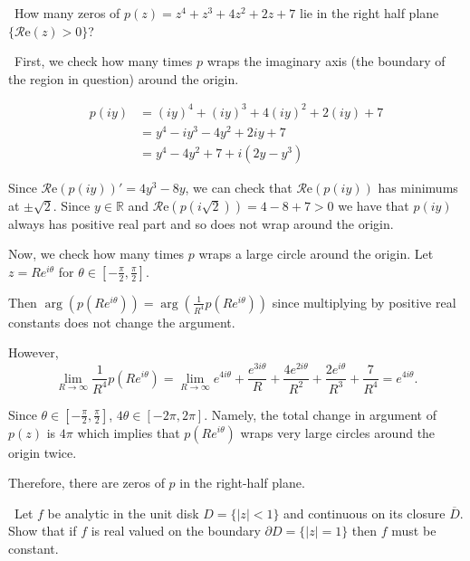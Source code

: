 \documentclass[12pt]{Homework}
\newcommand{\re}{\mathscr{R}\text{e}}
\begin{document}
\newpage

\begin{problem} $\,$
How many zeros of $p(z)=z^4+z^3+4z^2+2z+7$ lie in the right half plane $\{\re(z)>0\}$?
\end{problem}


\begin{solution}$\,$
First, we check how many times $p$ wraps the imaginary axis (the boundary of the region in question) around the origin.

\begin{align*}
    p(iy)&=(iy)^4+(iy)^3+4(iy)^2+2(iy)+7\\
    &=y^4-iy^3-4y^2+2iy+7\\
    &=y^4-4y^2+7+i(2y-y^3)
\end{align*}

Since $\re(p(iy))'=4y^3-8y$, we can check that $\re(p(iy))$ has minimums at $\pm\sqrt{2}$. Since $y\in\mathbb{R}$ and $\re(p(i\sqrt{2}))=4-8+7>0$ we have that $p(iy)$ always has positive real part and so does not wrap around the origin. 

Now, we check how many times $p$ wraps a large circle around the origin. Let $z=Re^{i\theta}$ for $\theta\in[-\frac{\pi}{2},\frac{\pi}{2}]$.

Then $\arg(p(Re^{i\theta}))=\arg(\frac{1}{R^4}p(Re^{i\theta}))$ since multiplying by positive real constants does not change the argument.

However, $$\lim_{R\to\infty}\frac{1}{R^4}p(Re^{i\theta})=\lim_{R\to\infty}e^{4i\theta}+\frac{e^{3i\theta}}{R}+\frac{4e^{2i\theta}}{R^2}+\frac{2e^{i\theta}}{R^3}+\frac{7}{R^4}=e^{4i\theta}.$$

Since $\theta\in[-\frac{\pi}{2},\frac{\pi}{2}]$, $4\theta\in[-2\pi,2\pi]$. Namely, the total change in argument of $p(z)$ is $4\pi$ which implies that $p(Re^{i\theta})$ wraps very large circles around the origin twice.

Therefore, there are  zeros of $p$ in the right-half plane.
\end{solution}
\newpage

\begin{problem} $\,$
Let $f$ be analytic in the unit disk $D=\{|z|<1\}$ and continuous on its closure $\overline{D}$. Show that if $f$ is real valued on the boundary $\partial D=\{|z|=1\}$ then $f$ must be constant.
\end{problem}
\end{document}
